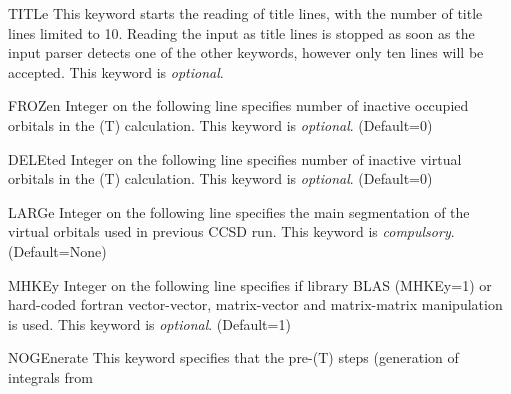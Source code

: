 \begin{keywordlist}
\item[TITLe]
This keyword starts the reading of title lines,
with the number of title lines limited to 10.
Reading the input as title lines is stopped as soon
as the input parser detects one of the other keywords,
however only ten lines will be accepted.
This keyword is {\it optional}.
\item[FROZen]
Integer on the following line specifies number of inactive occupied
orbitals in the (T) calculation. This keyword is {\it optional}. (Default=0)
\item[DELEted]
Integer on the following line specifies number of inactive virtual
orbitals in the (T) calculation. This keyword is {\it optional}. (Default=0)
\item[LARGe]
Integer on the following line specifies the main segmentation of the virtual orbitals
used in previous CCSD run. This keyword is {\it compulsory}. (Default=None)
\item[MHKEy]
Integer on the following line specifies if library BLAS (MHKEy=1) or hard-coded
fortran vector-vector, matrix-vector and matrix-matrix manipulation is used.
This keyword is {\it optional}. (Default=1)
\item[NOGEnerate]
This keyword specifies that the pre-(T) steps (generation of integrals from

\end{keywordlist}
